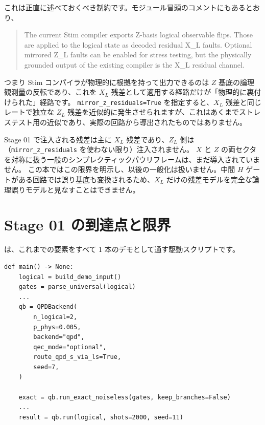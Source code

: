 これは正直に述べておくべき制約です。モジュール冒頭のコメントにもあるとおり、

\begin{quote}
The current Stim compiler exports Z-basis logical observable flips. Those are
applied to the logical state as decoded residual X\_L faults. Optional mirrored
Z\_L faults can be enabled for stress testing, but the physically grounded output
of the existing compiler is the X\_L residual channel.
\end{quote}

つまり Stim コンパイラが物理的に根拠を持って出力できるのは $Z$ 基底の論理観測量の反転であり、これを $X_L$ 残差として適用する経路だけが「物理的に裏付けられた」経路です。
\texttt{mirror\_z\_residuals=True} を指定すると、$X_L$ 残差と同じレートで独立な $Z_L$ 残差を近似的に発生させられますが、これはあくまでストレステスト用の近似であり、実際の回路から導出されたものではありません。

\begin{warningbox}
  Stage 01 で注入される残差は主に $X_L$ 残差であり、$Z_L$ 側は（\texttt{mirror\_z\_residuals} を使わない限り）注入されません。
  $X$ と $Z$ の両セクタを対称に扱う一般のシンプレクティックパウリフレームは、まだ導入されていません。
  この本ではこの限界を明示し、以後の一般化は扱いません。中間 $H$ ゲートがある回路では誤り基底も変換されるため、$X_L$ だけの残差モデルを完全な論理誤りモデルと見なすことはできません。
\end{warningbox}

\section{Stage 01 の到達点と限界}\label{sec:stage_a_marker}

 は、これまでの要素をすべて 1 本のデモとして通す駆動スクリプトです。

\begin{lstlisting}[caption={src/stages/01\_mpp/examples/ch13\_mpp\_integration.py のデモ本体（抜粋・行40--76）}]
def main() -> None:
    logical = build_demo_input()
    gates = parse_universal(logical)
    ...
    qb = QPDBackend(
        n_logical=2,
        p_phys=0.005,
        backend="qpd",
        qec_mode="optional",
        route_qpd_s_via_ls=True,
        seed=7,
    )

    exact = qb.run_exact_noiseless(gates, keep_branches=False)
    ...
    result = qb.run(logical, shots=2000, seed=11)
\end{lstlisting}

